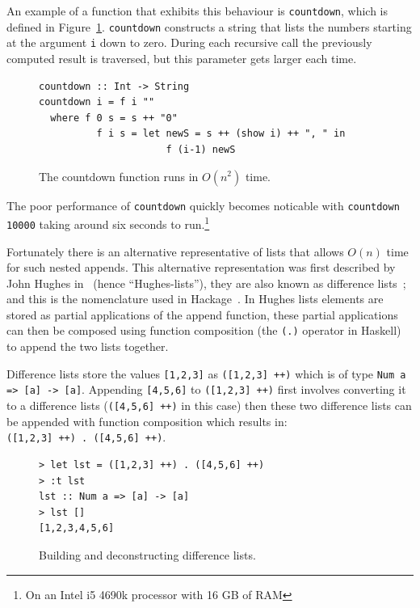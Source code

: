 An example of a function that exhibits this behaviour is \texttt{countdown}, which is defined in Figure~\ref{countdown}. \texttt{countdown} constructs a string that lists the numbers starting at the argument \texttt{i} down to zero. During each recursive call the previously computed result is traversed, but this parameter gets larger each time.

\begin{figure}[t]
\begin{lstlisting}
countdown :: Int -> String
countdown i = f i ""
  where f 0 s = s ++ "0"
          f i s = let newS = s ++ (show i) ++ ", " in
                      f (i-1) newS
\end{lstlisting}
\caption{The countdown function runs in $O(n^2)$ time.}
\label{countdown}
\end{figure}

The poor performance of \texttt{countdown} quickly becomes noticable with \texttt{countdown 10000} taking around six seconds to run.\footnote{On an Intel i5 4690k processor with 16 GB of RAM}

Fortunately there is an alternative representative of lists that allows $O(n)$ time for such nested appends. This alternative representation was first described by John Hughes in~\citep{hughesList} (hence ``Hughes-lists''), they are also known as difference lists~\citep{realWorldHaskell}; and this is the nomenclature used in Hackage~\citep{dlist}. In Hughes lists elements are stored as partial applications of the append function, these partial applications can then be composed using function composition (the \texttt{(.)} operator in Haskell) to append the two lists together. 

Difference lists store the values \texttt{[1,2,3]} as \texttt{([1,2,3] ++)} which is of type \texttt{Num a => [a] -> [a]}. Appending \texttt{[4,5,6]} to \texttt{([1,2,3] ++)} first involves converting it to a difference lists (\texttt{([4,5,6] ++)} in this case) then these two difference lists can be appended with function composition which results in: \\ \texttt{([1,2,3] ++) . ([4,5,6] ++)}. 

\begin{figure}[t]
\begin{lstlisting}
> let lst = ([1,2,3] ++) . ([4,5,6] ++)
> :t lst
lst :: Num a => [a] -> [a]
> lst []
[1,2,3,4,5,6]
\end{lstlisting}
\caption{Building and deconstructing difference lists.}
\label{ghciDList}
\end{figure}

